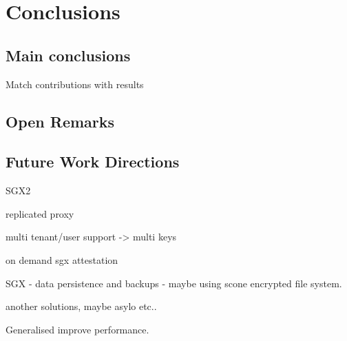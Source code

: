 
\chapter{Conclusions}
\label{cha:conclusions}

\section{Main conclusions}
\label{sec:main_conclusion}

Match contributions with results

\section{Open Remarks}
\label{sec:open_remarks}

\section{Future Work Directions}
\label{sec:future_work_directions}

SGX2

replicated proxy

multi tenant/user support -> multi keys

on demand sgx attestation

SGX - data persistence and backups - maybe using scone encrypted file system.

another solutions, maybe asylo etc..

Generalised improve performance.